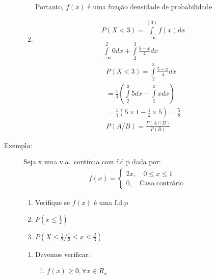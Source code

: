 \begin{description}
\begin{enumerate}[label=(\alph*)]
\begin{enumerate}[leftmargin=*, label=\roman*., widest=IV, align=left]
           \end{enumerate}
           Portanto, $f(x)$ é uma função densidade de probabilidade 
         \item 
           \begin{align*}
             P(X<3)= \int \limits_{-\infty}^{(3)} f(x)dx \\
             \int \limits_{-\infty}^{2}0 dx +      \int \limits_{2}^{3} \frac{5-x}{4} dx 
           \end{align*}
           \begin{align*}
             P(X<3)=\int \limits_{2}^{3} \frac{5-x}{4} dx \\
             =            \frac{1}{4} \left(\int \limits_{2}^{3} 5 dx - \int \limits_{2}^{3} x dx \right)\\
             =\frac{1}{4} \left(5\times 1- \frac{1}{2}\times 5\right)= \frac{5}{8}\\
             P(A/B)=\frac{P(A\cap B)}{P(B)}
           \end{align*}
       \end{enumerate}
     \item [Exemplo:] Seja x uma v.a.\ contínua com f.d.p dada por:
       \begin{align*}
         f(x)= 
         \begin{cases}
           2x,\quad 0\leq x \leq 1 \\ 
           0, \quad \text{Caso contrário}
         \end{cases}
       \end{align*}
       \begin{enumerate}[label=(\alph*)]
         \item Verifique se $f(x)$ é uma f.d.p
         \item$ P \left( x\le \frac{1}{2}\right)$
         \item $P \left(X\le \frac{1}{2} / \frac{1}{3} \le x \le \frac{2}{3}\right)$
       \end{enumerate}
       \begin{enumerate}[label=(\alph*)]
         \item 
           Devemos verificar: 
           \begin{enumerate}[leftmargin=*, label=\roman*., widest=IV, align=left] %

             \item $f(x)\geq 0, \forall x \in R_{x}$


\end{enumerate}
\end{enumerate}
\end{description}
